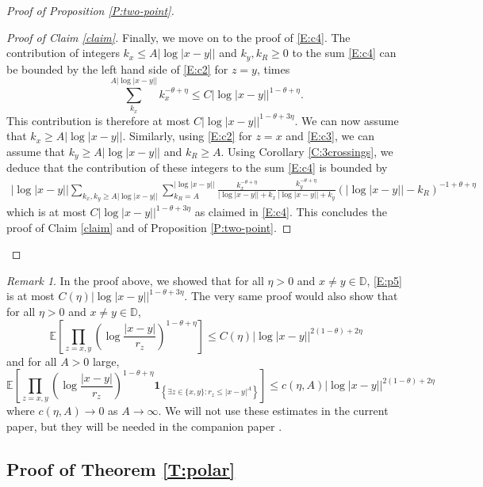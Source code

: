 \documentclass[11pt]{article}
\theoremstyle{remark}
\newtheorem{remark}[theorem]{Remark}
\newcommand{\D}{\mathbb{D}}
\newcommand{\Expect}[1]{\mathbb{E} \left[ #1 \right] }
\newcommand{\indic}[1]{ \mathbf{1}_{ \left\{ #1 \right\} } }
\numberwithin{equation}{section}
\begin{document}
\begin{proof}[Proof of Proposition \ref{P:two-point}]
\begin{proof}[Proof of Claim \ref{claim}]
Finally, we move on to the proof of \eqref{E:c4}. The contribution of integers $k_x \leq A|\log|x-y||$ and $k_y,k_R \geq 0$ to the sum \eqref{E:c4} can be bounded by the left hand side of \eqref{E:c2} for $z=y$, times
\[
\sum_{k_x}^{A|\log |x-y||} k_x^{-\theta+\eta} \leq C |\log |x-y||^{1-\theta+\eta}.
\]
This contribution is therefore at most $C|\log |x-y||^{1-\theta+3\eta}$. We can now assume that $k_x \geq A|\log|x-y||$. Similarly, using \eqref{E:c2} for $z=x$ and \eqref{E:c3}, we can assume that $k_y \geq A|\log|x-y||$ and $k_R \geq A$. Using Corollary \ref{C:3crossings},  we deduce that the contribution of these integers to the sum \eqref{E:c4} is bounded by
\begin{align*}
|\log|x-y|| \sum_{k_x,k_y \geq A|\log |x-y||} \sum_{k_R = A}^{|\log|x-y||} \frac{k_x^{-\theta+\eta}}{|\log|x-y|| + k_x} \frac{k_y^{-\theta+\eta}}{|\log|x-y|| + k_y} ( |\log |x-y|| - k_R )^{-1+\theta + \eta}
\end{align*}
which is at most $C |\log |x-y||^{1-\theta+3\eta}$ as claimed in \eqref{E:c4}. This concludes the proof of Claim \ref{claim} and of Proposition \ref{P:two-point}.
\end{proof}
\end{proof}


\begin{remark}
In the proof above, we showed that for all $\eta>0$ and $x \neq y \in \D$, \eqref{E:p5} is at most $C(\eta) |\log|x-y||^{1-\theta + 3\eta}$. The very same proof would also show that for all $\eta>0$ and $x \neq y \in \D$,
\begin{equation}
\Expect{ \prod_{z=x,y} \left( \log \frac{|x-y|}{r_z} \right)^{1-\theta + \eta} } \leq C(\eta) |\log |x-y||^{2(1-\theta) + 2\eta}
\end{equation}
and for all $A>0$ large,
\begin{equation}
\Expect{ \prod_{z=x,y} \left( \log \frac{|x-y|}{r_z} \right)^{1-\theta + \eta} \indic{\exists z \in \{x,y\}: r_z \leq |x-y|^A} } \leq c(\eta,A) |\log |x-y||^{2(1-\theta) + 2\eta}
\end{equation}
where $c(\eta,A) \to 0$ as $A \to \infty$.
We will not use these estimates in the current paper, but they will be needed in the companion paper \cite{JLQ23b}.
\end{remark}

\subsection{Proof of Theorem \ref{T:polar}}\label{SS:polar}
\end{document}

